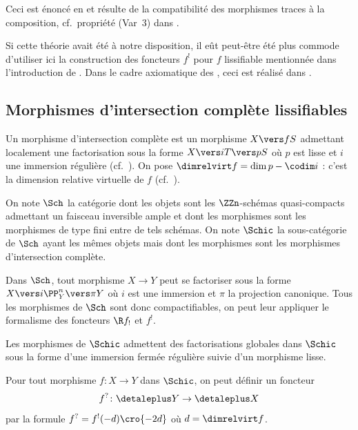 \documentclass[10pt]{../fichiers-configuration-latex/smfart}
\begin{document}
Ceci est énoncé en  et résulte de la
compatibilité des morphismes traces à la composition,
cf.~propriété (Var~3) dans .

\begin{remarque2}
Si cette théorie avait été à notre disposition, il eût peut-être été plus
commode d'utiliser ici la construction des foncteurs $f^!$ pour $f$
lissifiable mentionnée dans l'introduction de .
Dans le cadre axiomatique des , ceci
est réalisé dans \cite{THESE@Ayoub}.
\end{remarque2}

\subsection{Morphismes d'intersection complète lissifiables}%

\begin{definition2}\label{16-definition-intersection-complete}
Un morphisme d'intersection complète
est un morphisme 
$X\vers f S$ admettant localement une factorisation sous la forme
$X\vers i T\vers p S$ où $p$
est lisse et $i$ une immersion régulière (cf.~).
On pose
$\dimrelvirt f = \dim p-\codim i$ : c'est la dimension relative virtuelle
de $f$ (cf.~).
\end{definition2}

\begin{definition2}
On note $\Sch$ la catégorie dont les objets sont les $\ZZn$-schémas
quasi-compacts
admettant un faisceau inversible ample et dont les morphismes sont
les morphismes de type fini entre de tels schémas.
On note $\Schic$ la sous-catégorie de $\Sch$ ayant les mêmes objets mais
dont les morphismes sont les morphismes d'intersection complète.
\end{definition2}

Dans $\Sch$, tout morphisme $X\to Y$ peut se factoriser sous la forme
$X\vers i \PP^n_Y\vers \pi Y$ où $i$ est une immersion et $\pi$ la
projection canonique.
Tous les morphismes de $\Sch$ sont donc compactifiables, on
peut leur appliquer le formalisme des foncteurs $\R f_!$ et $f^!$.

Les morphismes de $\Schic$ admettent des factorisations globales dans
$\Schic$ sous la forme d'une immersion fermée régulière suivie d'un
morphisme lisse. 

\begin{definition2}
Pour tout morphisme $f\colon X\to Y$ dans $\Schic$, on peut
définir un foncteur
\[f^?\colon \detaleplus Y\to \detaleplus X\]
par la formule $f^?=f^!(-d)\cro{-2d}$
où $d=\dimrelvirt f$. 
\end{definition2}
\end{document}
